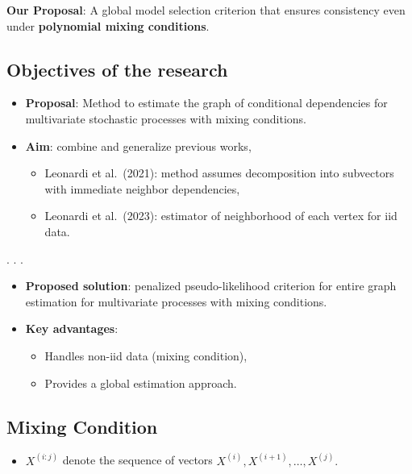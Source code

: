 \documentclass[
  english,
  letterpaper,
  DIV=11,
  numbers=noendperiod]{scrartcl}
\providecommand{\tightlist}{%
  \setlength{\itemsep}{0pt}\setlength{\parskip}{0pt}}
\begin{document}
\textbf{Our Proposal}: A global model selection criterion that ensures
consistency even under \textbf{polynomial mixing conditions}.

\subsection{Objectives of the
research}\label{objectives-of-the-research}

\begin{itemize}
\item
  \textbf{Proposal}: Method to estimate the graph of conditional
  dependencies for multivariate stochastic processes with mixing
  conditions.
\item
  \textbf{Aim}: combine and generalize previous works,

  \begin{itemize}
  \item
    Leonardi et al.~(2021): method assumes decomposition into subvectors
    with immediate neighbor dependencies,
  \item
    Leonardi et al.~(2023): estimator of neighborhood of each vertex for
    iid data.
  \end{itemize}
\end{itemize}

. . .

\begin{itemize}
\item
  \textbf{Proposed solution}: penalized pseudo-likelihood criterion for
  entire graph estimation for multivariate processes with mixing
  conditions.
\item
  \textbf{Key advantages}:

  \begin{itemize}
  \tightlist
  \item
    Handles non-iid data (mixing condition),
  \item
    Provides a global estimation approach.
  \end{itemize}
\end{itemize}

\subsection{Mixing Condition}\label{mixing-condition}

\begin{itemize}
\tightlist
\item
  \(X^{(i:j)}\) denote the sequence of vectors
  \(X^{(i)}, X^{(i+1)}, \ldots, X^{(j)}.\)
\end{itemize}
\end{document}
